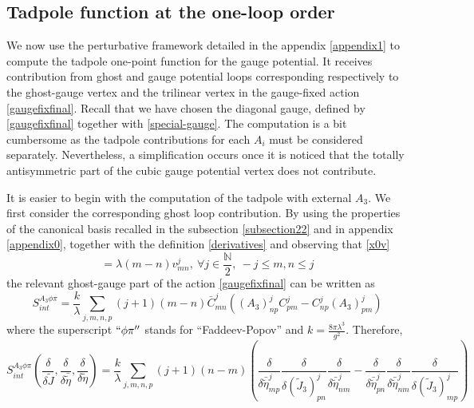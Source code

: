 \documentclass[11pt]{book}
\theoremstyle{break}
\begin{document}
\subsection*{Tadpole function at the one-loop order}\label{section4}

We now use the perturbative framework detailed  in the appendix \ref{appendix1} to compute the tadpole one-point function for the gauge potential. It receives contribution from ghost and gauge potential loops corresponding respectively to the ghost-gauge vertex and the trilinear vertex in the gauge-fixed action \eqref{gaugefixfinal}. Recall that we have chosen the diagonal gauge, defined by \eqref{gaugefixfinal} together with \eqref{special-gauge}. The computation is a bit cumbersome as the tadpole contributions for each $A_i$ must be considered separately. Nevertheless, a simplification occurs once it is noticed that the totally antisymmetric part of the cubic gauge potential vertex does not contribute.\par 
It is easier to begin with the computation of the tadpole with external $A_3$. We first consider the corresponding ghost loop contribution. By using the properties of the canonical basis recalled in the subsection \ref{subsection22} and in appendix \ref{appendix0}, together with the definition \eqref{derivatives} and observing that  \eqref{x0v}
\begin{equation}
[x_3,v^j_{mn}]=\lambda(m-n)v^j_{mn},\ \forall j\in\frac{\mathbb{N}}{2},\ -j\le m,n\le j
\end{equation}
the relevant ghost-gauge part of the action \eqref{gaugefixfinal} can be written as
\begin{equation}
S_{int}^{A_3\phi\pi}=\frac{k}{\lambda}\sum_{j,m,n,p}(j+1) (m-n)\bar C^j_{mn}((A_3)^j_{np}C^j_{pm}-C^j_{np}(A_3)^j_{pm})\label{sintghost}
\end{equation}
where the superscript $``\phi\pi''$ stands for ``Faddeev-Popov'' and $k=\frac{8\pi\lambda^3}{g^2}$.
Therefore,
\begin{equation}
S_{int}^{A_3\phi\pi}(\frac{\delta}{\delta \widetilde J},\frac{\delta}{\delta \bar{\widetilde \eta}},\frac{\delta}{\delta\widetilde\eta})=\frac{k}{\lambda}\sum_{j,m,n,p}(j+1) (n-m)(\frac{\delta}{\delta\bar{\widetilde \eta}^j_{mp}}\frac{\delta}{\delta (\widetilde J_3)^j_{pn}}\frac{\delta}{\delta\bar {\widetilde \eta}^j_{nm}}-\frac{\delta}{\delta\bar{\widetilde \eta}^j_{pn}}\frac{\delta}{\delta\bar {\widetilde\eta}^j_{nm}}\frac{\delta}{\delta (\widetilde J_3)^j_{mp}})\label{trilin-ghost-funct}
\end{equation}
\end{document}
